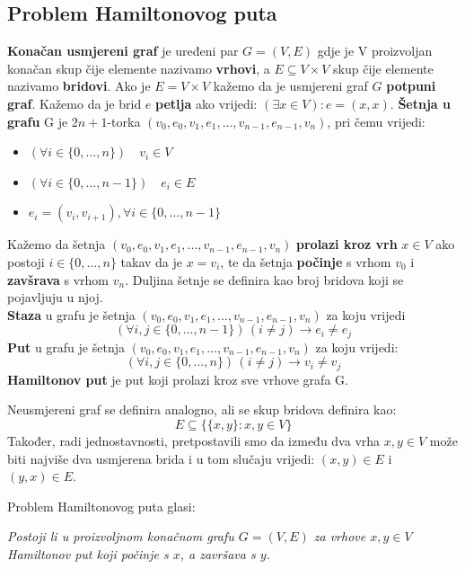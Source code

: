 \documentclass[12pt, a4paper]{book}
\begin{document}
\begin{spacing}{1.5}
\subsection{Problem Hamiltonovog puta}
\label{subsec:HPP}
\begin{defn}
\textbf{Konačan usmjereni graf} je uređeni par $G=(V,E)$ gdje je V proizvoljan konačan skup čije elemente nazivamo \textbf{vrhovi}, a $E\subseteq V \times V$ skup čije elemente nazivamo \textbf{bridovi}. Ako je $E=V\times	V$ kažemo da je usmjereni graf $G$ \textbf{potpuni graf}. Kažemo da je brid $e$ \textbf{petlja} ako vrijedi:
$(\exists x \in V) : e=(x,x)$.
\textbf{Šetnja u grafu} G je $2n+1$-torka $(v_0,e_0,v_1,e_1,...,v_{n-1},e_{n-1}, v_{n})$, pri čemu vrijedi:
\begin{itemize}
	\item $(\forall i \in \{0,...,n\}) \quad v_i \in V$
	\item $(\forall i \in \{0,...,n-1\}) \quad e_i \in E$
	\item $e_i=(v_i, v_{i+1}), \forall i \in \{0,...,n-1\}$
\end{itemize}
Kažemo da šetnja  $(v_0,e_0,v_1,e_1,...,v_{n-1},e_{n-1}, v_{n})$ \textbf{prolazi kroz vrh} $x \in V$ ako postoji $i \in \{0,...,n\}$ takav da je $x=v_i$, te da šetnja \textbf{počinje} s vrhom $v_0$ i \textbf{zavšrava} s vrhom $v_n$. Duljina šetnje se definira kao broj bridova koji se pojavljuju u njoj.\\
\textbf{Staza} u grafu je šetnja $(v_0,e_0,v_1,e_1,...,v_{n-1},e_{n-1}, v_{n})$ za koju vrijedi 
\[(\forall i,j \in \{0,...,n-1\})\, (i\neq j) \to e_i \neq e_j\] \textbf{Put} u grafu je šetnja $(v_0,e_0,v_1,e_1,...,v_{n-1},e_{n-1}, v_{n})$ za koju vrijedi:
\[(\forall i,j \in \{0,...,n\})\, (i\neq j) \to v_i \neq v_j\] \textbf{Hamiltonov put} je put koji prolazi kroz sve vrhove grafa G.
\end{defn}
\begin{nap}
Neusmjereni graf se definira analogno, ali se skup bridova definira kao:
\[E\subseteq \{\{x,y\} : x, y \in V\}\]
Također, radi jednostavnosti, pretpostavili smo da između dva vrha $x,y \in V$ može biti najviše dva usmjerena brida i u tom slučaju vrijedi: $(x,y) \in E$ i $(y,x) \in E$.  
\end{nap}
Problem Hamiltonovog puta glasi:\\
\begin{center}
\textit{Postoji li u proizvoljnom konačnom grafu $G=(V,E)$ za vrhove $x,y \in V$  Hamiltonov put koji počinje s $x$, a završava s $y$.}
\end{center}

\end{spacing}
\end{document}
